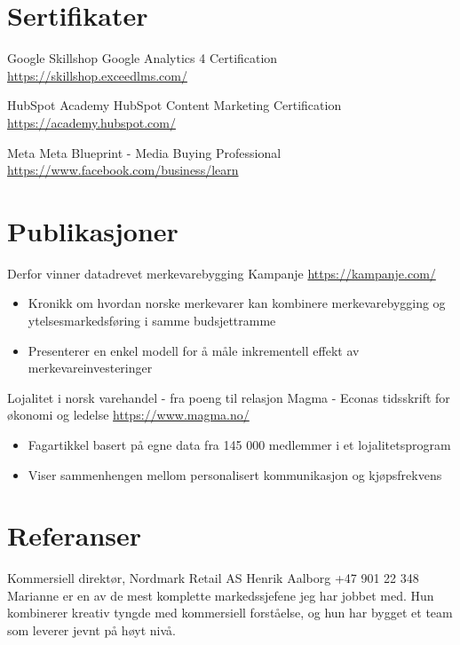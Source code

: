 \documentclass[a4paper, serif, 10pt]{moderncv}
\begin{document}
\section{Sertifikater}

        {Google Skillshop}
        {Google Analytics 4 Certification}
        {\url{https://skillshop.exceedlms.com/}}
        {}
        {}

        {HubSpot Academy}
        {HubSpot Content Marketing Certification}
        {\url{https://academy.hubspot.com/}}
        {}
        {}

        {Meta}
        {Meta Blueprint - Media Buying Professional}
        {\url{https://www.facebook.com/business/learn}}
        {}
        {}
\section{Publikasjoner}

        {Derfor vinner datadrevet merkevarebygging}
        {Kampanje}
        {\url{https://kampanje.com/}}
        {}
        {\begin{itemize}
\item Kronikk om hvordan norske merkevarer kan kombinere merkevarebygging og ytelsesmarkedsføring i samme budsjettramme
\item Presenterer en enkel modell for å måle inkrementell effekt av merkevareinvesteringer
\end{itemize}}

        {Lojalitet i norsk varehandel - fra poeng til relasjon}
        {Magma - Econas tidsskrift for økonomi og ledelse}
        {\url{https://www.magma.no/}}
        {}
        {\begin{itemize}
\item Fagartikkel basert på egne data fra 145 000 medlemmer i et lojalitetsprogram
\item Viser sammenhengen mellom personalisert kommunikasjon og kjøpsfrekvens
\end{itemize}}
\section{Referanser}

        {Kommersiell direktør, Nordmark Retail AS}
        {Henrik Aalborg}
        {+47 901 22 348}
        {}
        {Marianne er en av de mest komplette markedssjefene jeg har jobbet med. Hun kombinerer kreativ tyngde med kommersiell forståelse, og hun har bygget et team som leverer jevnt på høyt nivå.}
\end{document}
